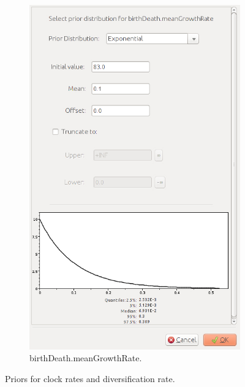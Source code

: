 {\begin{figure}[htbp]
        \begin{subfigure}[b]{0.325\textwidth}
            \includegraphics[width=\textwidth]{../screenshots/beauti-prior-birthrate.jpg}
            \caption{birthDeath.meanGrowthRate.}
            \label{fig:beautiPriorsBirthRate}
        \end{subfigure}
        \caption{Priors for clock rates and diversification rate.}
        \label{fig:beautiPriorsClocks}
    \end{figure}
    
}
